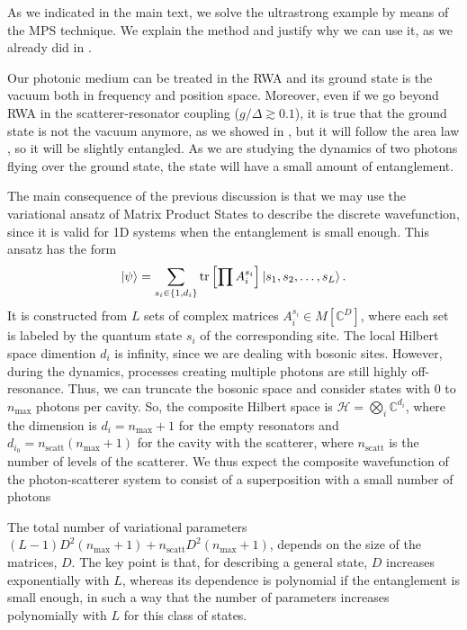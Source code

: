 \documentclass[notitlepage, prx, preprint, amsmath,superscriptaddress,amssymb]{revtex4-1}
\begin{document}
As we indicated in the main text, we solve the ultrastrong example by means of the MPS technique. We explain the method and justify why we can use it, as we already did in \cite{Sanchez-Burillo2014,Sanchez-Burillo2015,Sanchez-Burillo2016a}.

Our photonic medium can be treated in the RWA and its ground state is the vacuum both in frequency and position space. Moreover, even if we go beyond RWA in the scatterer-resonator coupling ($g/\Delta\gtrsim 0.1$), it is true that the ground state is not the vacuum anymore, as we showed in \cite{Sanchez-Burillo2014}, but it will follow the area law \cite{Eisert2010}, so it will be slightly entangled. As we are studying the dynamics of two photons flying over the ground state, the state will have a small amount of entanglement.

The main consequence of the previous discussion is that we may use the variational ansatz of Matrix Product States \cite{Ripoll2006,Verstraete2008} to describe the discrete wavefunction, since it is valid for 1D systems when the entanglement is small enough. This ansatz has the form
\begin{equation}
\ket{\psi} = \sum_{s_i \in \{1,d_i\}} \mathrm{tr}\left[
\prod A_i^{s_i}\right] \ket{s_1,s_2,\ldots,s_L}.
\label{eq:mps}
\end{equation}
It is constructed from $L$ sets of complex matrices $A_i^{s_i} \in M[\mathbb{C}^{D}]$, where each set is labeled by the quantum state $s_i$ of the corresponding site. The local Hilbert space dimention $d_i$ is infinity, since we are dealing with bosonic sites. However, during the dynamics, processes creating multiple photons are still highly off-resonance. Thus, we can truncate the bosonic space and consider states with $0$ to
$n_\text{max}$ photons per cavity. So, the composite Hilbert space is $\mathcal{H}=\bigotimes_i \mathbb{C}^{d_i}$, where the dimension is $d_i=n_\text{max}+1$ for the empty resonators and $d_{i_0}=n_\text{scatt}(n_\text{max}+1)$ for the cavity with the scatterer, where $n_\text{scatt}$ is the number of levels of the scatterer. We thus expect the composite wavefunction of the photon-scatterer system to consist of a superposition with a small number of photons

The total number of variational parameters $(L-1)D^2(n_\text{max}+1) + n_\text{scatt}D^2(n_\text{max}+1)$, depends on the size of the matrices, $D$. The key point is that, for describing a general state, $D$ increases exponentially with $L$, whereas its dependence is polynomial if the entanglement is small enough, in such a way that the number of parameters increases polynomially with $L$ for this class of states.
\end{document}
